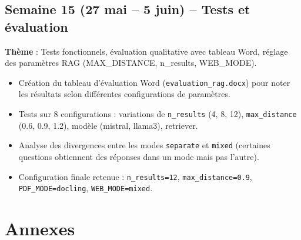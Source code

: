 \documentclass[12pt,a4paper]{report}
\begin{document}
\section{Semaine 15 (27 mai -- 5 juin) -- Tests et \'{e}valuation}
\begin{infobox}
\textbf{Th\`{e}me} : Tests fonctionnels, \'{e}valuation qualitative avec tableau Word, r\'{e}glage
des param\`{e}tres RAG (MAX\_DISTANCE, n\_results, WEB\_MODE).
\end{infobox}
\begin{itemize}[leftmargin=*]
  \item Cr\'{e}ation du tableau d'\'{e}valuation Word (\texttt{evaluation\_rag.docx}) pour noter
        les r\'{e}sultats selon diff\'{e}rentes configurations de param\`{e}tres.
  \item Tests sur 8 configurations : variations de \texttt{n\_results} (4, 8, 12),
        \texttt{max\_distance} (0.6, 0.9, 1.2), mod\`{e}le (mistral, llama3), retriever.
  \item Analyse des divergences entre les modes \texttt{separate} et \texttt{mixed}
        (certaines questions obtiennent des r\'{e}ponses dans un mode mais pas l'autre).
  \item Configuration finale retenue : \texttt{n\_results=12}, \texttt{max\_distance=0.9},
        \texttt{PDF\_MODE=docling}, \texttt{WEB\_MODE=mixed}.
\end{itemize}

\appendix
\chapter*{Annexes}
\end{document}
